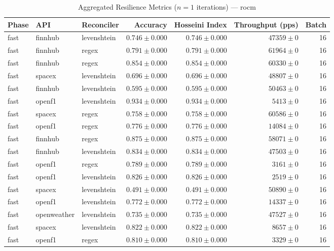 
\begin{table}[htbp]
\caption{Aggregated Resilience Metrics ($n=1$ iterations) --- rocm}
\begin{tabular}{l l l r r r r}
\hline
Phase & API & Reconciler & Accuracy & Hosseini Index & Throughput (pps) & Batch \\
\hline
fast & finnhub & levenshtein & $0.746\pm0.000$ & $0.746\pm0.000$ & $47359\pm0$ & 16 \\
fast & finnhub & regex & $0.791\pm0.000$ & $0.791\pm0.000$ & $61964\pm0$ & 16 \\
fast & finnhub & regex & $0.854\pm0.000$ & $0.854\pm0.000$ & $60330\pm0$ & 16 \\
fast & spacex & levenshtein & $0.696\pm0.000$ & $0.696\pm0.000$ & $48807\pm0$ & 16 \\
fast & finnhub & levenshtein & $0.595\pm0.000$ & $0.595\pm0.000$ & $50463\pm0$ & 16 \\
fast & openf1 & levenshtein & $0.934\pm0.000$ & $0.934\pm0.000$ & $5413\pm0$ & 16 \\
fast & spacex & regex & $0.758\pm0.000$ & $0.758\pm0.000$ & $60586\pm0$ & 16 \\
fast & openf1 & regex & $0.776\pm0.000$ & $0.776\pm0.000$ & $14084\pm0$ & 16 \\
fast & finnhub & regex & $0.875\pm0.000$ & $0.875\pm0.000$ & $58071\pm0$ & 16 \\
fast & finnhub & levenshtein & $0.834\pm0.000$ & $0.834\pm0.000$ & $47503\pm0$ & 16 \\
fast & openf1 & regex & $0.789\pm0.000$ & $0.789\pm0.000$ & $3161\pm0$ & 16 \\
fast & openf1 & levenshtein & $0.826\pm0.000$ & $0.826\pm0.000$ & $2519\pm0$ & 16 \\
fast & spacex & levenshtein & $0.491\pm0.000$ & $0.491\pm0.000$ & $50890\pm0$ & 16 \\
fast & openf1 & levenshtein & $0.772\pm0.000$ & $0.772\pm0.000$ & $14337\pm0$ & 16 \\
fast & openweather & levenshtein & $0.735\pm0.000$ & $0.735\pm0.000$ & $47527\pm0$ & 16 \\
fast & spacex & levenshtein & $0.822\pm0.000$ & $0.822\pm0.000$ & $8657\pm0$ & 16 \\
fast & openf1 & regex & $0.810\pm0.000$ & $0.810\pm0.000$ & $3329\pm0$ & 16 \\

\end{tabular}
\end{table}
